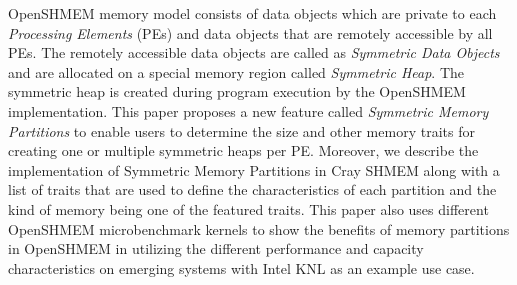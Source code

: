 OpenSHMEM memory model consists of data objects which are private
to each \emph{Processing Elements} (PEs) and data objects that are
remotely accessible by all PEs. The remotely accessible data objects
are called as \emph{Symmetric Data Objects} and are allocated on a
special memory region called \emph{Symmetric Heap}. The symmetric heap
is created during program execution by the OpenSHMEM implementation.
This paper proposes a new feature called \emph{Symmetric Memory
Partitions} to enable users to determine the size and other memory
traits for creating one or multiple symmetric heaps per PE. Moreover,
we describe the implementation of Symmetric Memory Partitions in
Cray SHMEM along with a list of traits that are used to define the
characteristics of each partition and the kind of memory being one of
the featured traits. This paper also uses different OpenSHMEM
microbenchmark kernels to show the benefits of memory partitions in
OpenSHMEM in utilizing the different performance and capacity
characteristics on emerging systems with Intel KNL as an example use
case.
